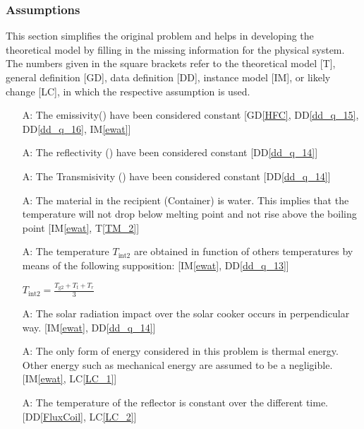 \documentclass[12pt]{article}
\newcommand{\dref}[1]{GD\ref{#1}}
\newcommand{\ddref}[1]{DD\ref{#1}}
\newcommand{\tref}[1]{T\ref{#1}}
\newcounter{assumpnum} %
\newcommand{\iref}[1]{IM\ref{#1}}
\newcommand{\lcref}[1]{LC\ref{#1}}
\begin{document}
\subsubsection{Assumptions} \label{sec_assumpt}


This section simplifies the original problem and helps in developing the
theoretical model by filling in the missing information for the physical
system. The numbers given in the square brackets refer to the theoretical model
[T], general definition [GD], data definition [DD], instance model [IM], or
likely change [LC], in which the respective assumption is used.

\begin{itemize}

\item[A\refstepcounter{assumpnum}\theassumpnum \label{A_common_constant_A_1}:] The emissivity(\si{\epsilon}) have been considered constant [\dref{HFC}, \ddref{dd_q_15}, \ddref{dd_q_16}, \iref{ewat}] 

\item[A\refstepcounter{assumpnum}\theassumpnum \label{A_common_constant_A_2}:] The reflectivity (\si{\rho}) have been considered constant [\ddref{dd_q_14}]

\item[A\refstepcounter{assumpnum}\theassumpnum \label{A_common_constant_A_3}:] The Transmisivity (\si{\tau}) have been considered constant [\ddref{dd_q_14}]

\item[A\refstepcounter{assumpnum}\theassumpnum \label{A_fluid_type}:] The material in the recipient (Container) is water. This implies that the  temperature will not drop below melting point and not rise above the boiling point [\iref{ewat}, \tref{TM_2}]   

\item[A\refstepcounter{assumpnum}\theassumpnum \label{A_int_temp_formula}:] The temperature $T_\text{int2}$ are obtained in function of others temperatures by means of the following supposition: [\iref{ewat}, \ddref{dd_q_13}] 
~\newline


\begin{center}  
$T_\text{int2} = \frac{T_\text{g2} + T_t + T_r}{3} $ 
\end{center}

\item[A\refstepcounter{assumpnum}\theassumpnum \label{A_radiation_impact}:] The solar radiation impact over the solar cooker occurs in perpendicular way. [\iref{ewat}, \ddref{dd_q_14}] 

\item[A\refstepcounter{assumpnum}\theassumpnum \label{A_radiation_impact_a_7}:] The only form of energy considered in this problem is thermal energy. Other energy such as mechanical energy are assumed to be a negligible. [\iref{ewat}, \lcref{LC_1}] 

\item[A\refstepcounter{assumpnum}\theassumpnum \label{A_radiation_impact_a_8}:] The temperature of the reflector is constant over the different time. [\ddref{FluxCoil}, \lcref{LC_2}] 


\end{itemize}
\end{document}
